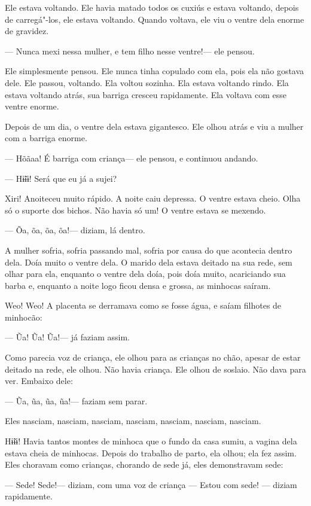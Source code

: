 Ele estava voltando. Ele havia matado todos os cuxiús e estava voltando,
depois de carregá"-los, ele estava voltando. Quando voltava, ele viu o
ventre dela enorme de gravidez. 

--- Nunca mexi nessa mulher, e tem filho nesse ventre!--- ele pensou. 

Ele simplesmente pensou. Ele nunca tinha copulado com ela, pois ela não
gostava dele. Ele passou, voltando. Ela voltou sozinha. Ela estava
voltando rindo. Ela estava voltando atrás, sua barriga cresceu
rapidamente. Ela voltava com esse ventre enorme. 

Depois de um dia, o ventre dela estava gigantesco. Ele olhou atrás e viu
a mulher com a barriga enorme. 

--- Hõãaa! É barriga com criança--- ele pensou, e continuou andando. 

--- Hɨ̃ɨɨ! Será que eu já a sujei?

Xiri! Anoiteceu muito rápido. A noite caiu depressa. O ventre estava
cheio. Olha só o suporte dos bichos. Não havia só um! O ventre estava se
mexendo. 

--- Õa, õa, õa, õa!--- diziam, lá dentro. 

A mulher sofria, sofria passando mal, sofria por causa do que acontecia
dentro dela. Doía muito o ventre dela. O marido dela estava deitado na
sua rede, sem olhar para ela, enquanto o ventre dela doía, pois doía
muito, acariciando sua barba e, enquanto a noite logo ficou densa e
grossa, as minhocas saíram.

Weo! Weo! A placenta se derramava como se fosse água, e saíam filhotes de
minhocão:

--- Ũa! Ũa! Ũa!--- já faziam assim. 

Como parecia voz de criança, ele olhou para as crianças no chão, apesar
de estar deitado na rede, ele olhou. Não havia criança. Ele olhou de
soslaio. Não dava para ver. Embaixo dele:

--- Ũa, ũa, ũa, ũa!--- faziam sem parar. 

Eles nasciam, nasciam, nasciam, nasciam, nasciam, nasciam, nasciam. 

Hɨ̃ɨɨ! Havia tantos montes de minhoca que o fundo da casa sumiu, a vagina
dela estava cheia de minhocas. Depois do trabalho de parto, ela
olhou; ela fez assim. Eles choravam como crianças, chorando de sede
já, eles demonstravam sede: 

--- Sede! Sede!--- diziam, com uma voz de criança --- Estou com sede! ---
diziam rapidamente. 

